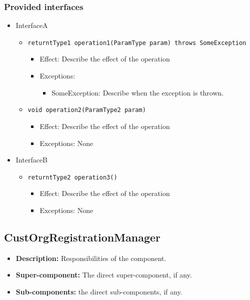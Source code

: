 \documentclass[a4paper,10pt]{article}
\begin{document}
\subsubsection*{Provided interfaces}
\begin{itemize}
    \item InterfaceA
    \begin{itemize}
        \item \texttt{returntType1 operation1(ParamType param) throws SomeException}
        \begin{itemize}
            \item Effect: Describe the effect of the operation
            \item Exceptions:
            \begin{itemize}
                \item SomeException: Describe when the exception is thrown.
            \end{itemize}
		\end{itemize}
        \item \texttt{void operation2(ParamType2 param)}
        \begin{itemize}
             \item Effect: Describe the effect of the operation
             \item Exceptions: None
        \end{itemize} 
    \end{itemize}

    \item InterfaceB
    \begin{itemize}
        \item \texttt{returntType2 operation3()}
        \begin{itemize}
            \item Effect: Describe the effect of the operation
            \item Exceptions: None
        \end{itemize}
    \end{itemize}
\end{itemize}

\subsection{CustOrgRegistrationManager}
\begin{itemize}
    \item \textbf{Description:} Responsibilities of the component.
    \item \textbf{Super-component:} The direct super-component, if any.
    \item \textbf{Sub-components:} the direct sub-components, if any.
\end{itemize}
\end{document}
